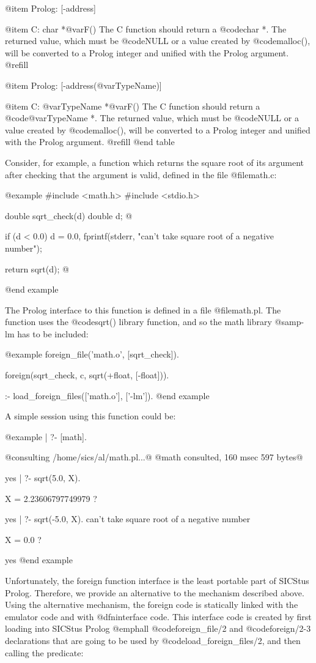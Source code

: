 @item Prolog: [-address]

@item C:      char *@var{F}()
The C function should return a @code{char *}.  The returned value, which
must be @code{NULL} or a value created by @code{malloc()}, will be
converted to a Prolog integer and unified with the Prolog argument.
@refill

@item Prolog: [-address(@var{TypeName})]

@item C:      @var{TypeName} *@var{F}()
The C function should return a @code{@var{TypeName} *}.  The returned
value, which must be @code{NULL} or a value created by @code{malloc()},
will be converted to a Prolog integer and unified with the Prolog
argument. @refill
@end table

Consider, for example, a function which returns the square root of its
argument after checking that the argument is valid, defined in the file
@file{math.c}:

@example
#include <math.h>
#include <stdio.h>

double sqrt_check(d)
     double d;
@{
  if (d < 0.0)
    d = 0.0,
    fprintf(stderr, "can't take square root of a negative number\n");

  return sqrt(d);
@}
@end example

The Prolog interface to this function is defined in a file
@file{math.pl}.  The function uses the @code{sqrt()} library function,
and so the math library @samp{-lm} has to be included:

@example
foreign_file('math.o', [sqrt_check]).

foreign(sqrt_check, c, sqrt(+float, [-float])).

:- load_foreign_files(['math.o'], ['-lm']).
@end example

A simple session using this function could be:

@example
| ?- [math].

@{consulting /home/sics/al/math.pl...@}
@{math consulted, 160 msec 597 bytes@}

yes
| ?- sqrt(5.0, X).

X = 2.23606797749979 ? 

yes
| ?- sqrt(-5.0, X).
can't take square root of a negative number

X = 0.0 ? 

yes
@end example

Unfortunately, the foreign function interface is the least portable part
of SICStus Prolog.  Therefore, we provide an alternative to the
mechanism described above.  Using the alternative mechanism, the foreign
code is statically linked with the emulator code and with @dfn{interface
code}.  This interface code is created by first loading into SICStus Prolog
@emph{all} @code{foreign_file/2} and @code{foreign/2-3} declarations that are
going to be used by @code{load_foreign_files/2}, and then calling the
predicate:

